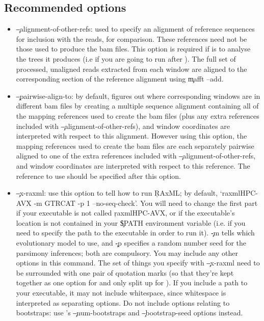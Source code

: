 \subsection{Recommended options} \label{sec:RecArgs}
\begin{itemize}
\item \c{--alignment-of-other-refs}: used to specify an alignment of reference sequences for inclusion with the reads, for comparison.
These references need not be those used to produce the bam files.
This option is required if \p is to analyse the trees it produces (i.e if you are going to run \pat after \pmt).
The full set of processed, unaligned reads extracted from each window are aligned to the corresponding section of the reference alignment using \c{mafft --add}.
\item \c{--pairwise-align-to}: by default, \pmt figures out where corresponding windows are in different bam files by creating a multiple sequence alignment containing all of the mapping references used to create the bam files (plus any extra references included with \c{--alignment-of-other-refs}), and window coordinates are interpreted with respect to this alignment.
However using this option, the mapping references used to create the bam files are each separately pairwise aligned to one of the extra references included with \c{--alignment-of-other-refs}, and window coordinates are interpreted with respect to this reference.
The reference to use should be specified after this option.
\item \c{--x-raxml}: use this option to tell \pmt how to run \c{RAxML}; by default, \c{`raxmlHPC-AVX -m GTRCAT -p 1 --no-seq-check'}.
You will need to change the first part if your \R executable is not called \c{raxmlHPC-AVX}, or if the executable's location is not contained in your \c{\$PATH} environment variable (i.e. if you need to specify the path to the executable in order to run it).
\c{-m} tells \R which evolutionary model to use, and \c{-p} specifies a random number seed for the parsimony inferences; both are compulsory.
You may include any other \R options in this command.
The set of things you specify with \c{--x-raxml} need to be surrounded with one pair of quotation marks (so that they're kept together as one option for \pmt and only split up for \R).
If you include a path to your \R executable, it may not include whitespace, since whitespace is interpreted as separating \R options.
Do not include options relating to bootstraps: use \pmt's \c{--num-bootstraps} and \c{--bootstrap-seed} options instead.

\end{itemize}
